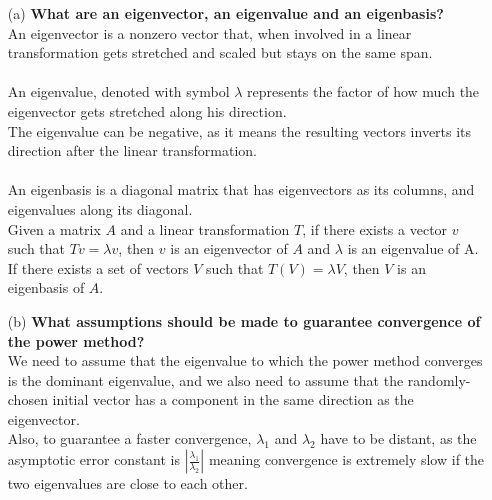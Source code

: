 \documentclass[unicode,11pt,a4paper,oneside,numbers=endperiod,openany]{scrartcl}
\begin{document}
\begin{enumerate}
\item[(a)] \textbf{What are an eigenvector, an eigenvalue and an eigenbasis?}\\
An eigenvector is a nonzero vector that, when involved in a linear transformation gets stretched and scaled but stays on the same span. \\\\
An eigenvalue, denoted with symbol $\lambda$ represents the factor of how much the eigenvector gets stretched along his direction. \\
The eigenvalue can be negative, as it means the resulting vectors inverts its direction after the linear transformation.  \\\\
An eigenbasis is a diagonal matrix that has eigenvectors as its columns, and eigenvalues along its diagonal.\\
Given a matrix $A$ and a linear transformation $T$, 
if there exists a vector $v$ such that $Tv = \lambda v$,
then $v$ is an eigenvector of $A$ and $\lambda$ is an eigenvalue of A.
If there exists a set of vectors $V$ such that $T(V) = \lambda V$, then $V$ is an eigenbasis of $A$.




\item[(b)] \textbf{What assumptions should be made to guarantee convergence of the power method?}\\
We need to assume that the eigenvalue to which the power method converges 
is the dominant eigenvalue, and we also need to assume that the randomly-chosen initial vector has a component in the same direction as the eigenvector.\\
Also, to guarantee a faster convergence, $\lambda _1$ and $\lambda _2$ have to be distant, as the asymptotic error constant is $|\frac{\lambda _1}{\lambda _2}|$ meaning convergence is extremely slow if the two eigenvalues are close to each other.


\end{enumerate}
\end{document}
